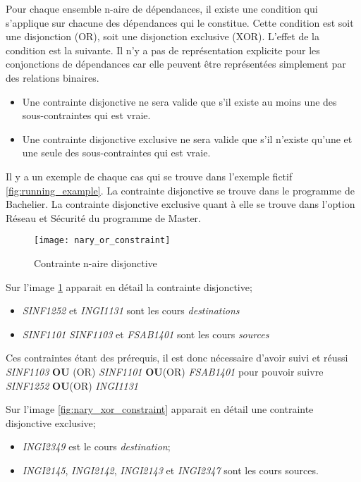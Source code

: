Pour chaque ensemble n-aire de dépendances, il existe une condition qui s'applique sur chacune des dépendances qui le constitue. Cette condition est soit une disjonction (OR), soit une disjonction exclusive (XOR). L'effet de la condition est la suivante. Il n'y a pas de représentation explicite pour les conjonctions de dépendances car elle peuvent être représentées simplement par des relations binaires.

\begin{itemize}
\item Une contrainte disjonctive ne sera valide que s'il existe au moins une des sous-contraintes qui est vraie.
\item Une contrainte disjonctive exclusive ne sera valide que s'il n'existe qu'une et une seule des sous-contraintes qui est vraie.
\end{itemize}

Il y a un exemple de chaque cas qui se trouve dans l'exemple fictif \ref{fig:running_example}. La contrainte disjonctive se trouve dans le programme de Bachelier. La contrainte disjonctive exclusive quant à elle se trouve dans l'option Réseau et Sécurité du programme de Master.

\begin{figure}
\centering
\caption{Contrainte n-aire disjonctive}
\label{fig:nary_or_constraint}
\texttt{[image: nary\_or\_constraint]}
\end{figure}


Sur l'image \ref{fig:nary_or_constraint} apparait en détail la contrainte disjonctive;
\begin{itemize}
  \item \textit{SINF1252} et \textit{INGI1131} sont les cours \textit{destinations}
  \item \textit{SINF1101} \textit{SINF1103} et \textit{FSAB1401} sont les cours \textit{sources}
\end{itemize}

Ces contraintes étant des prérequis, il est donc nécessaire d'avoir suivi et réussi \textit{SINF1103} \textbf{OU} (OR) \textit{SINF1101} \textbf{OU}(OR) \textit{FSAB1401} pour pouvoir suivre \textit{SINF1252} \textbf{OU}(OR) \textit{INGI1131}

Sur l'image \ref{fig:nary_xor_constraint} apparait en détail une contrainte disjonctive exclusive;

\begin{itemize}
\item \textit{INGI2349} est le cours \textit{destination};
\item \textit{INGI2145}, \textit{INGI2142}, \textit{INGI2143} et \textit{INGI2347} sont les cours sources.
\end{itemize}

